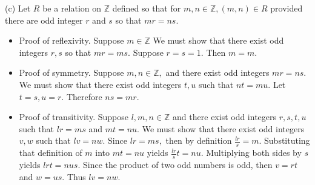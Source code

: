 \documentclass[12pt, letterpaper]{article}
\newcommand{\Z}{\mathbb{Z}}
\begin{document}
(c) Let $R$ be a relation on $\mathbb{Z}$ defined so that for $m, n \in \mathbb{Z},(m, n) \in R$ provided there are odd integer $r$ and $s$ so that $m r=n s$.\\
\begin{itemize}
	\item Proof of reflexivity.  Suppose $m\in \Z$  We must show that there exist odd integers $r,s$ so that $mr = ms.$  Suppose $r=s=1.$  Then $m=m.$
	\item Proof of symmetry. Suppose $m,n \in \Z,$ and there exist odd integers $mr = ns.$  We must show that there exist odd integers $t,u$ such that $nt = mu.$  Let $t=s, u =r.$  Therefore $ns = mr.$
	\item Proof of transitivity.  Suppose $l,m,n \in \Z$ and there exist odd integers $r,s,t,u$ such that $lr = ms$ and $mt = nu$.  We must show that there exist odd integers $v,w$ such that $lv = nw.$  Since $lr = ms,$ then by definition $\frac{lr}{s} = m.$  Substituting that definition of $m$ into $mt = nu$ yields $\frac{lr}{s}t = nu.$  Multiplying both sides by $s$ yields $lrt = nus.$  Since the product of two odd numbers is odd, then $v = rt$ and $w = us.$ Thus $lv = nw.$
\end{itemize}
\end{document}
